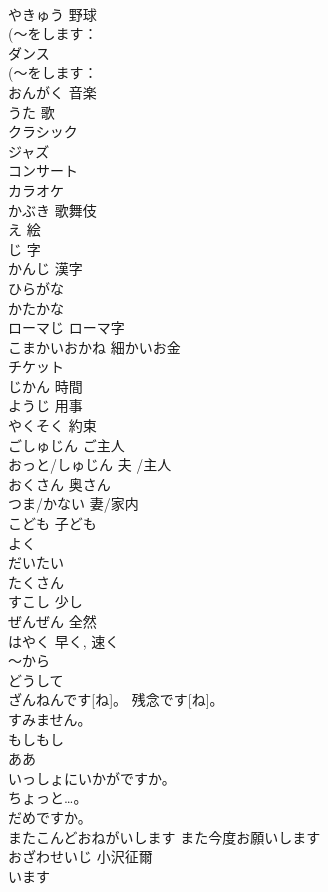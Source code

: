 \documentclass[8pt]{extreport}
\begin{document}
\begin{CJK}{UTF8}{min}
\\	やきゅう	野球	
\\	(～をします：
\\	ダンス			
\\	(～をします：
\\	おんがく	音楽	
\\	うた	歌	
\\	クラシック			
\\	ジャズ			
\\	コンサート			
\\	カラオケ			
\\	かぶき	歌舞伎	
\\	え	絵	
\\	じ	字	
\\	かんじ	漢字	
\\	ひらがな			
\\	かたかな			
\\	ローマじ	ローマ字	
\\	こまかいおかね	細かいお金	
\\	チケット			
\\	じかん	時間	
\\	ようじ	用事	
\\	やくそく	約束	
\\	ごしゅじん	ご主人	
\\	おっと/しゅじん	夫 /主人	
\\	おくさん	奥さん	
\\	つま/かない	妻/家内	
\\	こども	子ども	
\\	よく			
\\	だいたい			
\\	たくさん			
\\	すこし	少し	
\\	ぜんぜん	全然	
\\	はやく	早く, 速く	
\\	～から			
\\	どうして			
\\	ざんねんです[ね]。	残念です[ね]。	
\\	すみません。			
\\	もしもし			
\\	ああ			
\\	いっしょにいかがですか。			
\\	[～は]ちょっと…。			
\\	だめですか。			
\\	またこんどおねがいします	また今度お願いします	
\\	おざわせいじ	小沢征爾	
\\	います			

\end{CJK}
\end{document}
